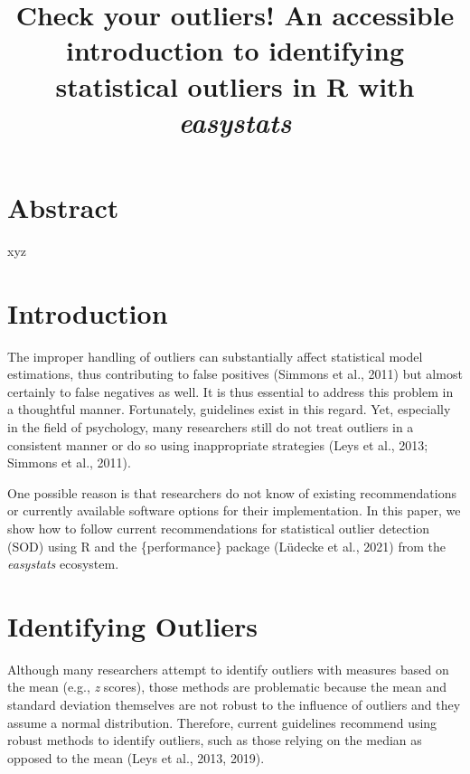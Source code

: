 \documentclass[
]{article}
\title{Check your outliers! An accessible introduction to identifying statistical outliers in R with \emph{easystats}}
\author{}
\date{\vspace{-2.5em}}
\begin{document}
\maketitle

\hypertarget{abstract}{%
\section{Abstract}\label{abstract}}

xyz

\hypertarget{introduction}{%
\section{Introduction}\label{introduction}}

The improper handling of outliers can substantially affect statistical model estimations, thus contributing to false positives (Simmons et al., 2011) but almost certainly to false negatives as well. It is thus essential to address this problem in a thoughtful manner. Fortunately, guidelines exist in this regard. Yet, especially in the field of psychology, many researchers still do not treat outliers in a consistent manner or do so using inappropriate strategies (Leys et al., 2013; Simmons et al., 2011).

One possible reason is that researchers do not know of existing recommendations or currently available software options for their implementation. In this paper, we show how to follow current recommendations for statistical outlier detection (SOD) using R and the \{performance\} package (Lüdecke et al., 2021) from the \emph{easystats} ecosystem.

\hypertarget{identifying-outliers}{%
\section{Identifying Outliers}\label{identifying-outliers}}

Although many researchers attempt to identify outliers with measures based on the mean (e.g., \emph{z} scores), those methods are problematic because the mean and standard deviation themselves are not robust to the influence of outliers and they assume a normal distribution. Therefore, current guidelines recommend using robust methods to identify outliers, such as those relying on the median as opposed to the mean (Leys et al., 2013, 2019).
\end{document}
